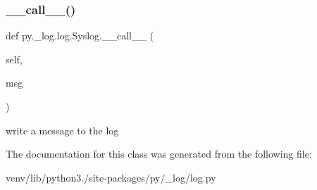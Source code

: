 \subsubsection{\texorpdfstring{\+\_\+\+\_\+call\+\_\+\+\_\+()}{\_\_call\_\_()}}
{\footnotesize\ttfamily def py.\+\_\+log.\+log.\+Syslog.\+\_\+\+\_\+call\+\_\+\+\_\+ (\begin{DoxyParamCaption}\item[{}]{self,  }\item[{}]{msg }\end{DoxyParamCaption})}

\begin{DoxyVerb}write a message to the log \end{DoxyVerb}
 

The documentation for this class was generated from the following file\+:\begin{DoxyCompactItemize}
\item 
venv/lib/python3./site-\/packages/py/\+\_\+log/log.\+py\end{DoxyCompactItemize}
